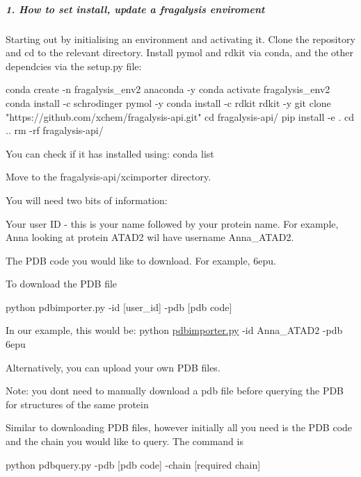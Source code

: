 \label{invalid_invalid}%
%
\subparagraph*{1. How to set install, update a fragalysis enviroment}

Starting out by initialising an environment and activating it. Clone the repository and cd to the relevant directory. Install pymol and rdkit via conda, and the other dependcies via the setup.\+py file\+:


\begin{DoxyCode}
conda create -n fragalysis\_env2 anaconda -y
conda activate fragalysis\_env2
conda install -c schrodinger pymol -y
conda install -c rdkit rdkit -y
git clone "https://github.com/xchem/fragalysis-api.git"
cd fragalysis-api/
pip install -e .
cd ..
rm -rf fragalysis-api/
\end{DoxyCode}


You can check if it has installed using\+: {\ttfamily conda list}

Move to the fragalysis-\/api/xcimporter directory.

You will need two bits of information\+:
\begin{DoxyEnumerate}
\item Your \textquotesingle{}user ID\textquotesingle{} -\/ this is your name followed by your protein name. For example, Anna looking at protein A\+T\+A\+D2 wil have username \textquotesingle{}Anna\+\_\+\+A\+T\+A\+D2\textquotesingle{}.
\item The P\+DB code you would like to download. For example, \textquotesingle{}6epu\textquotesingle{}.
\end{DoxyEnumerate}

To download the P\+DB file


\begin{DoxyCode}
python pdbimporter.py -id [user\_id] -pdb [pdb code]
\end{DoxyCode}


In our example, this would be\+: {\ttfamily python \hyperlink{pdbimporter_8py_source}{pdbimporter.\+py} -\/id Anna\+\_\+\+A\+T\+A\+D2 -\/pdb 6epu}

Alternatively, you can upload your own P\+DB files.

Note\+: you don\textquotesingle{}t need to manually download a pdb file before querying the P\+DB for structures of the same protein

Similar to downloading P\+DB files, however initially all you need is the P\+DB code and the chain you would like to query. The command is


\begin{DoxyCode}
python pdbquery.py -pdb [pdb code] -chain [required chain]
\end{DoxyCode}


